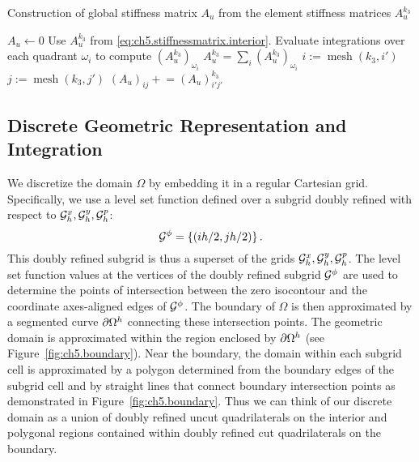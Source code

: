 \begin{algorithm}[htbp]
\caption{Construction of global stiffness matrix $A_u$ from the element stiffness matrices $A_u^{k_3}$}
\label{alg:ch5.stiffnessmatrix.construction}
\begin{algorithmic}[1]
\STATE $A_u \leftarrow 0$
        \STATE Use $A_u^{k_3}$ from \eqref{eq:ch5.stiffnessmatrix.interior}.
    \ELSE
        \STATE Evaluate integrations over each quadrant $\omega_i$ to compute $(A_u^{k_3})_{\omega_i}$
        \STATE $A_u^{k_3} = \sum_i (A_u^{k_3})_{\omega_i}$
    \ENDIF
        \STATE $i := \operatorname{mesh}(k_3,i')$ 
            \STATE $j := \operatorname{mesh}(k_3,j')$
            \STATE $(A_u)_{ij} +\!= (A_u)^{k_3}_{i'j'}$
        \ENDFOR
    \ENDFOR
\ENDFOR
\end{algorithmic}
\end{algorithm}

\subsection{Discrete Geometric Representation and Integration} \label{subsec:ch5.discretization.geometry}

We discretize the domain $\Omega$ by embedding it in a regular Cartesian grid. Specifically, we use a level set function defined over a subgrid doubly refined with respect to $\mathcal{G}^x_h, \mathcal{G}^y_h, \mathcal{G}^p_h$:
\begin{equation*}
\mathcal{G}^{\phi} = \left\lbrace (ih/2, jh/2) \right\rbrace.
\end{equation*}
This doubly refined subgrid is thus a superset of the grids $\mathcal{G}^x_h, \mathcal{G}^y_h, \mathcal{G}^p_h$. The level set function values at the vertices of the doubly refined subgrid $\mathcal{G}^{\phi}$ are used to determine the points of intersection between the zero isocontour and the coordinate axes-aligned edges of $\mathcal{G}^{\phi}$. The boundary of $\Omega$ is then approximated by a segmented curve $\partial\Omega^h$ connecting these intersection points. The geometric domain is approximated within the region enclosed by $\partial\Omega^h$ (see Figure~\ref{fig:ch5.boundary}). Near the boundary, the domain within each subgrid cell is approximated by a polygon determined from the boundary edges of the subgrid cell and by straight lines that connect boundary intersection points as demonstrated in Figure~\ref{fig:ch5.boundary}. Thus we can think of our discrete domain as a union of doubly refined uncut quadrilaterals on the interior and polygonal regions contained within doubly refined cut quadrilaterals on the boundary.

